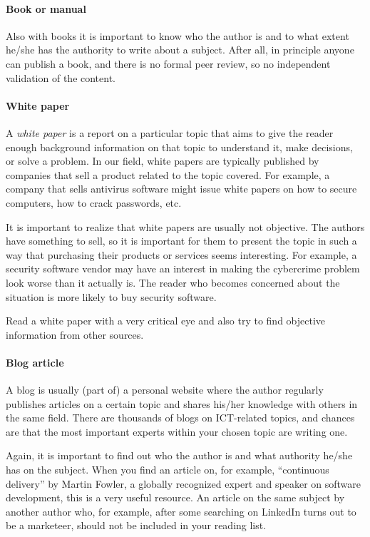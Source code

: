 \paragraph{Book or manual}

Also with books it is important to know who the author is and to what extent he/she has the authority to write about a subject. After all, in principle anyone can publish a book, and there is no formal peer review, so no independent validation of the content.


\paragraph{White paper}

A \emph{white paper} is a report on a particular topic that aims to give the reader enough background information on that topic to understand it, make decisions, or solve a problem. In our field, white papers are typically published by companies that sell a product related to the topic covered. For example, a company that sells antivirus software might issue white papers on how to secure computers, how to crack passwords, etc.

It is important to realize that white papers are usually not objective. The authors have something to sell, so it is important for them to present the topic in such a way that purchasing their products or services seems interesting. For example, a security software vendor may have an interest in making the cybercrime problem look worse than it actually is. The reader who becomes concerned about the situation is more likely to buy security software.

Read a white paper with a very critical eye and also try to find objective information from other sources.

\paragraph{Blog article}

A blog is usually (part of) a personal website where the author regularly publishes articles on a certain topic and shares his/her knowledge with others in the same field. There are thousands of blogs on ICT-related topics, and chances are that the most important experts within your chosen topic are writing one.

Again, it is important to find out who the author is and what authority he/she has on the subject. When you find an article on, for example, ``continuous delivery'' by Martin Fowler, a globally recognized expert and speaker on software development, this is a very useful resource. An article on the same subject by another author who, for example, after some searching on LinkedIn turns out to be a marketeer, should not be included in your reading list.


